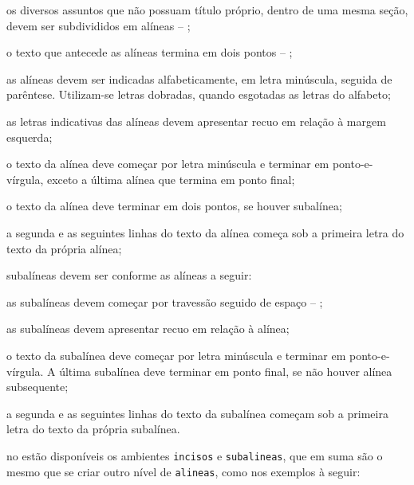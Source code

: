 %
\begin{alineas}

  \item os diversos assuntos que não possuam título próprio, dentro de uma mesma
  seção, devem ser subdivididos em alíneas -- \showfont;

  \item o texto que antecede as alíneas termina em dois pontos -- \showfont;
  \item as alíneas devem ser indicadas alfabeticamente, em letra minúscula,
  seguida de parêntese. Utilizam-se letras dobradas, quando esgotadas as
  letras do alfabeto;

  \item as letras indicativas das alíneas devem apresentar recuo em relação à
  margem esquerda;

  \item o texto da alínea deve começar por letra minúscula e terminar em
  ponto-e-vírgula, exceto a última alínea que termina em ponto final;

  \item o texto da alínea deve terminar em dois pontos, se houver subalínea;

  \item a segunda e as seguintes linhas do texto da alínea começa sob a
  primeira letra do texto da própria alínea;

  \item subalíneas \cite[4.3]{NBR6024:2012} devem ser conforme as alíneas a
  seguir:

  \begin{alineas}
     \item as subalíneas devem começar por travessão seguido de espaço -- \showfont;

     \item as subalíneas devem apresentar recuo em relação à alínea;

     \item o texto da subalínea deve começar por letra minúscula e terminar em
     ponto-e-vírgula. A última subalínea deve terminar em ponto final, se não
     houver alínea subsequente;

     \item a segunda e as seguintes linhas do texto da subalínea começam sob a
     primeira letra do texto da própria subalínea.
  \end{alineas}

  \item no \abnTeX{} estão disponíveis os ambientes \texttt{incisos} e
  \texttt{subalineas}, que em suma são o mesmo que se criar outro nível de
  \texttt{alineas}, como nos exemplos à seguir:


\end{alineas}
